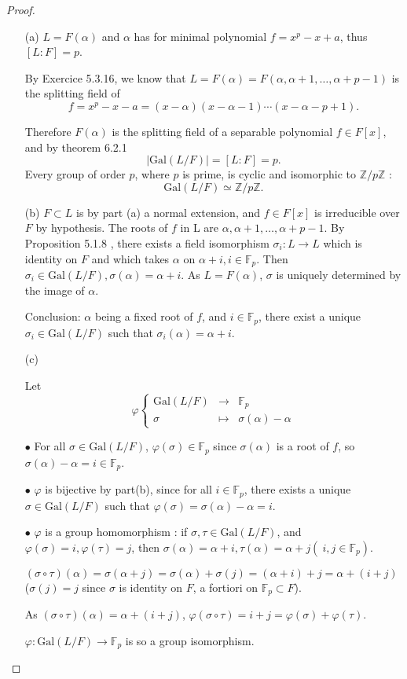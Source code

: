 \documentclass[11pt,a4paper]{article}
\newcommand{\Z}{\mathbb{Z}}
\newcommand{\F}{\mathbb{F}}
\newcommand{\Gal}{\mathrm{Gal}}
\begin{document}
\begin{proof}
\begin{enumerate}
\item[(a)]
$L=F(\alpha)$ and $\alpha$ has for minimal polynomial $f=x^p-x+a$, thus $[L:F]=p$.

By Exercice 5.3.16, we know that $L = F(\alpha) = F(\alpha, \alpha+1,\ldots,\alpha+p-1)$ is the splitting field of
$$f =x^p-x-a =  (x-\alpha)(x-\alpha-1)\cdots(x-\alpha- p+1).$$

Therefore $F(\alpha)$ is the splitting field of a separable polynomial $f \in F[x]$, and by theorem 6.2.1 $$\vert \Gal(L/F) \vert = [L:F] = p.$$
Every group of order $p$, where $p$ is prime, is cyclic and isomorphic to $\Z/p\Z$ : 
$$\Gal(L/F) \simeq \Z/p\Z.$$

\item[(b)]
 $F \subset L$ is by part (a) a normal extension, and $f \in F[x]$  is irreducible over $F$ by hypothesis. The roots of $f$ in L are $\alpha,\alpha +1, \ldots, \alpha+p-1$. By Proposition 5.1.8 , there exists a field isomorphism $\sigma_i : L \to L$ which is identity on $F$ and which takes $\alpha$ on $\alpha+i, i \in \F_p$. Then $\sigma_i \in \Gal(L/F), \sigma(\alpha) = \alpha+i$. As $L=F(\alpha)$, $\sigma$ is uniquely determined by the image of $\alpha$.
 
 Conclusion: $\alpha$ being a fixed root of $f$, and $i\in \F_p$, there exist a unique $\sigma_i \in \Gal(L/F)$ such that $ \sigma_i(\alpha) = \alpha+i$.

\item[(c)]
 
Let
$$
\varphi
\left\{
\begin{array}{ccc}
  \Gal(L/F)&\to    &\F_p  \\
  \sigma& \mapsto   &   \sigma(\alpha) - \alpha    
\end{array}
\right.
$$

$\bullet$ For all $\sigma \in \Gal(L/F)$, $\varphi(\sigma) \in \F_p$ since $\sigma(\alpha)$ is a root of $f$, so $\sigma(\alpha) - \alpha = i \in \F_p$.

 $\bullet$ $\varphi$ is bijective by part(b), since for all $i\in\F_p$, there exists a unique $\sigma \in \Gal(L/F)$ such that $\varphi(\sigma) = \sigma(\alpha) - \alpha = i$.
 
 $\bullet$ $\varphi$ is a group homomorphism : if $\sigma,\tau \in  \Gal(L/F)$, and $\varphi(\sigma) = i, \varphi(\tau) = j$, then $\sigma(\alpha) = \alpha+i, \tau(\alpha) = \alpha+j (\ i,j \in \F_p)$.
 
 $(\sigma \circ \tau)(\alpha) = \sigma(\alpha+j) = \sigma(\alpha) + \sigma(j) = (\alpha +i) +j = \alpha+(i+j)$ ($ \sigma(j) = j$ since $\sigma$ is identity on $F$, a fortiori on  $\F_p\subset F$).
 
 As $(\sigma \circ \tau)(\alpha) = \alpha+(i+j)$, $\varphi(\sigma \circ \tau) = i+j = \varphi(\sigma) + \varphi(\tau)$.
 
 $\varphi : \Gal(L/F) \to \F_p  $ is so a group isomorphism.
\end{enumerate}
\end{proof}
\end{document}
